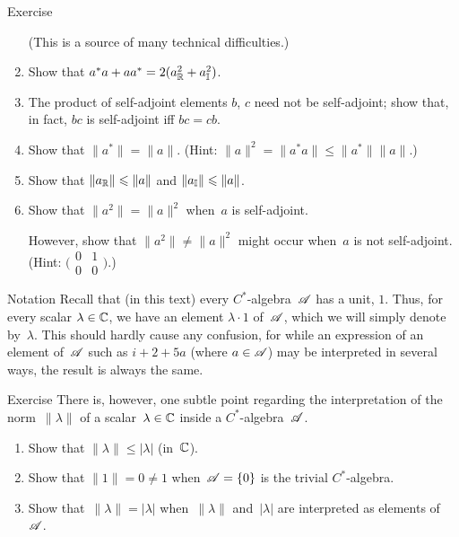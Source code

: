 \documentclass[a]{subfiles}
\begin{document}
\begin{parsec}
\begin{point}{Exercise}
\begin{enumerate}
(This is a source of many technical difficulties.)
\item
Show that $a^*a+aa^* = 2(a_{\mathbb{R}}^2+a_{\mathbb{I}}^2)$.
\item
The product of self-adjoint elements $b$, $c$ need not be self-adjoint;
show that, in fact, $bc$ is self-adjoint iff $bc=cb$.
\item
Show that $\|a^*\| = \|a\|$. (Hint:  $\|a\|^2=\|a^*a\|\leq \|a^*\|\|a\|$.)

\item
Show that $\|a_{\mathbb{R}}\|\leqslant \|a\|$ and $\|a_{\mathbb{I}}\|\leqslant \|a\|$.
\item
Show that $\|a^2\|=\|a\|^2$ when~$a$ is self-adjoint.

However,
show that $\|a^2\|\neq \|a\|^2$ might occur
when~$a$ is not self-adjoint.
(Hint: $\bigl(
\begin{smallmatrix}
	0&1\\
	0&0
\end{smallmatrix}
\bigr)$.)

\end{enumerate}
\end{point}
\end{parsec}
\begin{parsec}%
\begin{point}{Notation}%
Recall that (in this text) every $C^*$-algebra~$\mathscr{A}$ has a unit, $1$.
Thus, for every scalar $\lambda\in \mathbb{C}$,
we have an element $\lambda\cdot 1$ of~$\mathscr{A}$,
which we will simply denote by~$\lambda$.
This should hardly cause any confusion,
for while an expression of an element of~$\mathscr{A}$
such as $i+2+5a$ (where $a\in \mathscr{A}$) 
may be interpreted in several ways,
the result is always the same.
\end{point}
\begin{point}{Exercise}%
There is, however, one subtle point regarding
the interpretation
of the norm~$\|\lambda\|$ of a
scalar~$\lambda\in \mathbb{C}$ inside a $C^*$-algebra~$\mathscr{A}$.
\begin{enumerate}
\item 
Show that $\|\lambda\|\leq \left| \lambda\right|$ (in~$\mathbb{C}$).
\item
Show that $\|1\|=0\neq 1$ when~$\mathscr{A}=\{0\}$ is the trivial $C^*$-algebra.
\item
Show that~$\|\lambda\|=\left|\lambda\right|$
when~$\|\lambda\|$ and~$\left|\lambda\right|$
are interpreted as elements of~$\mathscr{A}$.
\end{enumerate}
\end{point}
\end{parsec}
\end{document}
